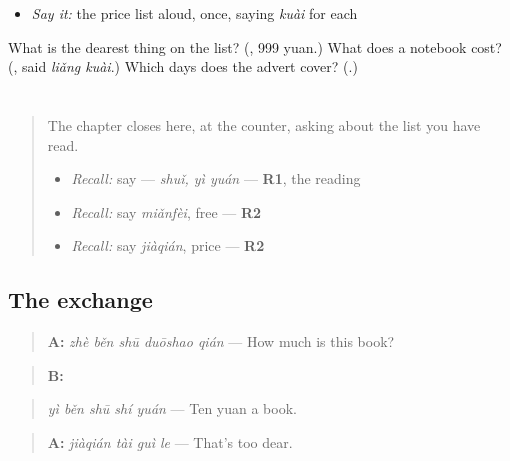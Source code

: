 \begin{itemize}
\raggedright
  \item \emph{Say it:} the price list aloud, once, saying \emph{kuài} for each 
\end{itemize}

\begin{tcolorbox}[breakable,colback=teal!4,colframe=teal!35!black,title={Before you move on}]
What is the dearest thing on the list? (\textbf{}, 999 yuan.) What does a notebook cost? (\textbf{}, said \emph{liǎng kuài}.) Which days does the advert cover? (\textbf{}.)
\end{tcolorbox}
\section[Practice]{}

\label{lesson:ZH-C156-practice}



\begin{quote}
The chapter closes here, at the counter, asking about the list you have read.

\begin{itemize}
\raggedright
  \item \emph{Recall:} say   — \emph{shuǐ, yì yuán} — \textbf{R1}, the reading
  \item \emph{Recall:} say \emph{miǎnfèi}, free — \textbf{R2}
  \item \emph{Recall:} say \emph{jiàqián}, price — \textbf{R2}
\end{itemize}
\end{quote}

\subsection*{The exchange}
\begin{quote}
\textbf{A:} \emph{zhè běn shū duōshao qián} — How much is this book?
\end{quote}

\begin{quote}
\textbf{B:} 
\end{quote}

\begin{quote}
\emph{yì běn shū shí yuán} — Ten yuan a book.
\end{quote}

\begin{quote}
\textbf{A:} \emph{jiàqián tài guì le} — That's too dear.
\end{quote}

